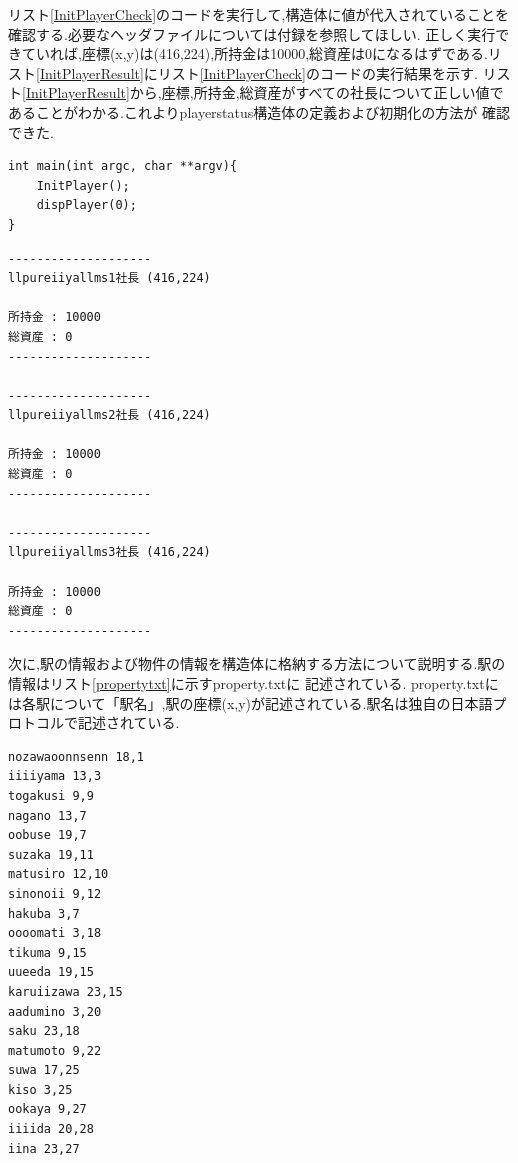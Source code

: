 \documentclass[a4j]{jarticle}
\begin{document}
    リスト\ref{InitPlayerCheck}のコードを実行して,構造体に値が代入されていることを確認する.必要なヘッダファイルについては付録を参照してほしい.
    正しく実行できていれば,座標(x,y)は(416,224),所持金は10000,総資産は0になるはずである.リスト\ref{InitPlayerResult}にリスト\ref{InitPlayerCheck}のコードの実行結果を示す.
    リスト\ref{InitPlayerResult}から,座標,所持金,総資産がすべての社長について正しい値であることがわかる.これよりplayerstatus構造体の定義および初期化の方法が
    確認できた.
    \begin{lstlisting}[basicstyle=\ttfamily\footnotesize, frame=single,label=InitPlayerCheck,caption=InitPlayer関数の動作確認]
int main(int argc, char **argv){
    InitPlayer();
    dispPlayer(0);
}
  \end{lstlisting}   

  \begin{lstlisting}[basicstyle=\ttfamily\footnotesize, frame=single,label=InitPlayerResult,caption=リスト\ref{InitPlayerCheck}の実行結果]
--------------------
llpureiiyallms1社長 (416,224)

所持金 : 10000
総資産 : 0
--------------------

--------------------
llpureiiyallms2社長 (416,224)

所持金 : 10000
総資産 : 0
--------------------

--------------------
llpureiiyallms3社長 (416,224)

所持金 : 10000
総資産 : 0
--------------------
      \end{lstlisting} 
      
    次に,駅の情報および物件の情報を構造体に格納する方法について説明する.駅の情報はリスト\ref{propertytxt}に示すproperty.txtに
    記述されている. property.txtには各駅について「駅名」,駅の座標(x,y)が記述されている.駅名は独自の日本語プロトコルで記述されている.
    \begin{lstlisting}[basicstyle=\ttfamily\footnotesize, frame=single,label=propertytxt,caption=property.txt]
nozawaoonnsenn 18,1
iiiiyama 13,3
togakusi 9,9
nagano 13,7
oobuse 19,7
suzaka 19,11
matusiro 12,10
sinonoii 9,12
hakuba 3,7
oooomati 3,18
tikuma 9,15
uueeda 19,15
karuiizawa 23,15
aadumino 3,20
saku 23,18
matumoto 9,22
suwa 17,25
kiso 3,25
ookaya 9,27
iiiida 20,28
iina 23,27
            \end{lstlisting}    
    
\end{document}
